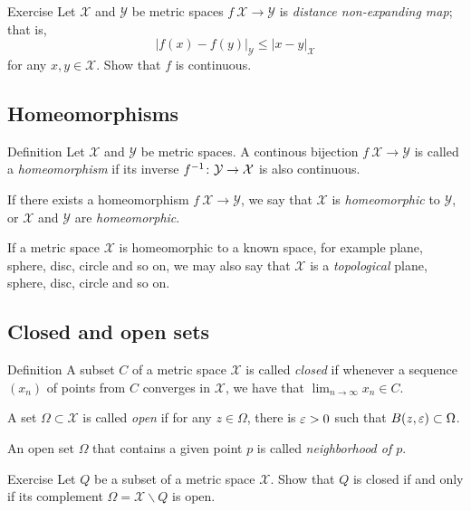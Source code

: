 \begin{thm}{Exercise}\label{ex:shrt=>continuous}
Let ${\mathcal X}$ and ${\mathcal Y}$ be metric spaces $f\:{\mathcal X}\to {\mathcal Y}$ is \emph{distance non-expanding map}; that is, 
\[|f(x)-f(y)|_{\mathcal Y}\le |x-y|_{\mathcal X}\]
for any $x,y\in \mathcal X$.
Show that $f$ is continuous.
\end{thm}

\subsection*{Homeomorphisms}

\begin{thm}{Definition}
Let ${\mathcal X}$ and ${\mathcal Y}$ be metric spaces.
A continous bijection $f\:{\mathcal X}\to {\mathcal Y}$ 
is called a \emph{homeomorphism} 
if its inverse $f^{-1}\:{\mathcal Y}\z\to {\mathcal X}$ is also continuous.

If there exists a homeomorphism $f\:{\mathcal X}\to {\mathcal Y}$,
we say that ${\mathcal X}$ is {}\emph{homeomorphic} to ${\mathcal Y}$,
or  $\mathcal X$ and ${\mathcal Y}$ are {}\emph{homeomorphic}.
\end{thm}

If a metric space $\mathcal X$ is homeomorphic to a known space, for example plane, sphere, disc, circle and so on,
we may also say that $\mathcal X$ is a \emph{topological} plane, sphere, disc, circle and so on.

\subsection*{Closed and open sets}

\begin{thm}{Definition}
A subset $C$ of a metric space $\mathcal{X}$ is called \emph{closed} if whenever a sequence $(x_n)$ of points from $C$ converges in $\mathcal{X}$, we have that $\lim_{n\to\infty} x_n \in C$.

A set $\Omega \subset \mathcal{X}$ is called \emph{open} if for any $z\in \Omega$, 
there is $\varepsilon>0$ such that $B(z,\varepsilon)\subset\Omega$.
\end{thm}

An open set $\Omega$ that contains a given point $p$ is called \emph{neighborhood of $p$}.

\begin{thm}{Exercise}\label{ex:close-open}
Let $Q$ be a subset of a metric space $\mathcal{X}$.
Show that $Q$ is closed if and only if its complement $\Omega=\mathcal{X}\backslash Q$ is open.
\end{thm}
